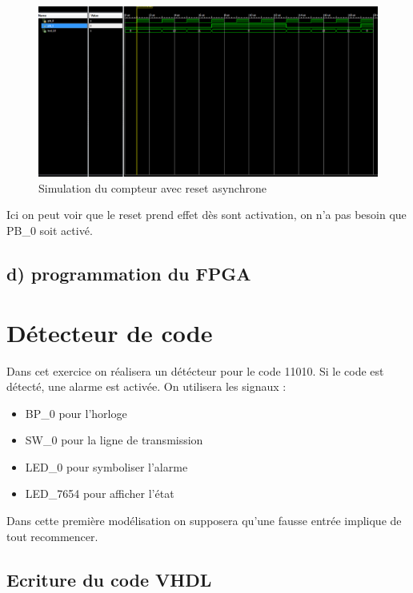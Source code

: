 \documentclass[11pt]{report}
\begin{document}
\begin{figure}[h]
\includegraphics[width=15cm]{TP02-5.PNG}
\caption{Simulation du compteur avec reset asynchrone}
\end{figure}

Ici on peut voir que le reset prend effet dès sont activation, on n'a pas besoin que PB\_0 soit activé. 

  
   \subsection{ d) programmation du FPGA}
   
   
 

\section{Détecteur de code}

Dans cet exercice on réalisera un détécteur pour le code 11010. Si le code est détecté, une alarme est activée. On utilisera les signaux :
\begin{itemize}
	\item BP\_0 pour l'horloge
	\item SW\_0 pour la ligne de transmission
	\item LED\_0 pour symboliser l'alarme
	\item LED\_7654 pour afficher l'état

\end{itemize}

Dans cette première modélisation on supposera qu'une fausse entrée implique de tout recommencer. 

\subsection{Ecriture du code VHDL}
\end{document}

